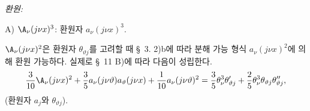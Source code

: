 
\noindent\emph{환원:}

\noindent A) $\A_\nu(j\nu x)^3$: 환원자 $a_\nu(j\nu x)^3$.

$\A_\nu(j\nu x)^2$은 환원자 $\theta_{\vartheta j}$를 고려할 때 \S\ 3. 2)b에 따라 분해 가능 형식 $a_\nu(j\nu x)^2$에 의해 환원 가능하다. 실제로 \S\ 11 B)에 따라 다음이 성립한다.
\[
\frac3{10}\A_\nu(j\nu x)^2+\frac35a_\nu(j\nu\vartheta)a_\vartheta(j\nu x)
+\frac1{10}a_\nu(j\nu\vartheta)^2
=\frac35\theta_\nu^3\theta_{\vartheta j}'+\frac25\theta_\nu^3\theta_{\vartheta j}\theta_{\vartheta j}'',
\]
(환원자 $a_j$와 $\theta_{\vartheta j}$).
